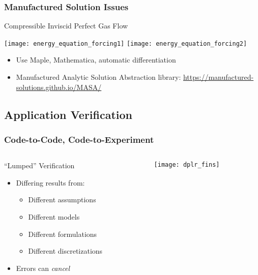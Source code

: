 \begin{frame}
\frametitle{Manufactured Solution Issues}
\begin{block}{Compressible Inviscid Perfect Gas Flow}

\texttt{[image: energy\_equation\_forcing1]}
\texttt{[image: energy\_equation\_forcing2]}

\end{block}

\begin{itemize}
\item Use Maple, Mathematica, automatic differentiation
\item Manufactured Analytic Solution Abstraction library:
      \url{https://manufactured-solutions.github.io/MASA/}
\end{itemize}

\end{frame}

\subsection{Application Verification}

\begin{frame}
\frametitle{Code-to-Code, Code-to-Experiment}
\begin{columns}
\begin{column}{.5\textwidth}
\begin{block}{``Lumped'' Verification}
\begin{itemize}
\item Differing results from:
\begin{itemize}
\item Different assumptions
\item Different models
\item Different formulations
\item Different discretizations
\end{itemize}
\item Errors can \emph{cancel}
\end{itemize}
\end{block}
\end{column}
\begin{column}{.5\textwidth}
\begin{center}
\texttt{[image: dplr\_fins]}
\end{center}
\end{column}
\end{columns}

\end{frame}

